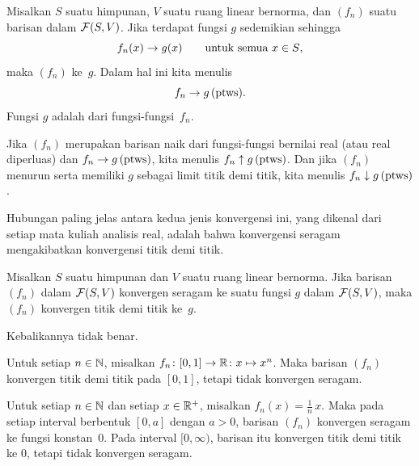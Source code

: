 \begin{defn} Misalkan $S$ suatu himpunan, $V$ suatu ruang linear bernorma, dan $(f_n)$
suatu barisan dalam $\mathcal{F}(S,V)$. Jika terdapat fungsi $g$ sedemikian sehingga
  \[ f_n(x) \rightarrow g(x) \qquad \text{untuk semua $x \in S$}, \]
maka $(f_n)$
 ke~$g$. Dalam hal ini kita menulis
  \[ f_n \rightarrow g \text{\,(ptws)}. \]
Fungsi $g$ adalah
 dari fungsi-fungsi~$f_n$.

Jika $(f_n)$ merupakan barisan naik dari fungsi-fungsi bernilai real (atau real
diperluas) dan $f_n \rightarrow g \text{\,(ptws)}$, kita menulis
$f_n \uparrow g \text{\,(ptws)}$. Dan jika $(f_n)$ menurun serta memiliki $g$ sebagai
limit titik demi titik, kita menulis
$f_n \downarrow g \text{\,(ptws)}$.
\end{defn}

Hubungan paling jelas antara kedua jenis konvergensi ini, yang dikenal dari setiap mata
kuliah analisis real, adalah bahwa konvergensi seragam mengakibatkan konvergensi titik demi
titik.

\begin{prop}\label{C023141} Misalkan $S$ suatu himpunan dan $V$ suatu ruang linear bernorma.
Jika barisan $(f_n)$ dalam $\mathcal{F}(S,V)$ konvergen seragam ke suatu fungsi $g$ dalam
$\mathcal{F}(S,V)$, maka $(f_n)$ konvergen titik demi titik ke~$g$.
\end{prop}

Kebalikannya tidak benar.

\begin{exam} Untuk setiap $n \in \mathbb{N}$, misalkan
$f_n\colon [0,1] \rightarrow \mathbb{R}\colon x \mapsto x^n$. Maka barisan $(f_n)$ konvergen titik demi
titik pada $[0,1]$, tetapi tidak konvergen seragam.
\end{exam}

\begin{exam} Untuk setiap $n \in \mathbb{N}$ dan setiap $x \in \mathbb{R}^+$, misalkan
$f_n(x) = \frac1n\, x$. Maka pada setiap interval berbentuk $[0,a]$ dengan $a > 0$,
barisan $(f_n)$ konvergen seragam ke fungsi konstan~$0$. Pada interval $[0,\infty)$,
barisan itu konvergen titik demi titik ke $0$, tetapi tidak konvergen seragam.
\end{exam}

